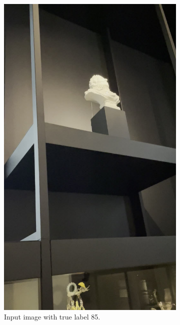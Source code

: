 \begin{figure}[h]
    \begin{subfigure}[b]{0.4\textwidth}
        \centering
        \includegraphics[width=\textwidth]{img/85.jpg}
        \caption{Input image with true label 85.}
    \end{subfigure}
    \hfill
    \begin{subfigure}[b]{0.4\textwidth}
        \centering

\end{subfigure}
\end{figure}
